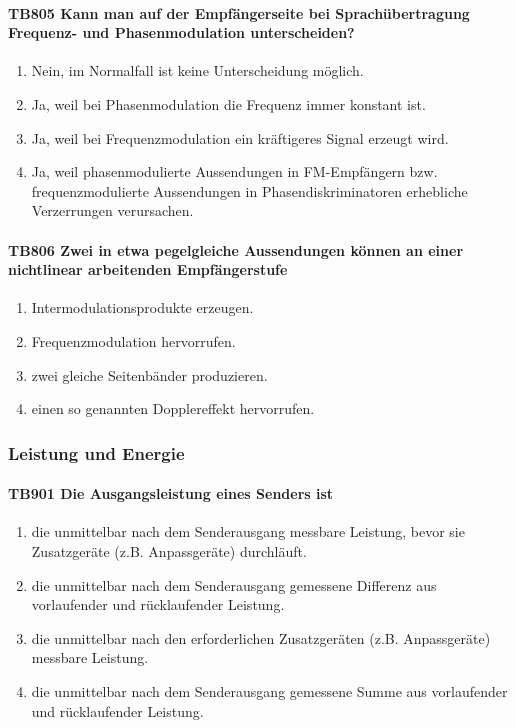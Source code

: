 \documentclass[8pt]{article}
\begin{document}
\begin{enumerate}
\paragraph*{TB805 Kann man auf der Empfängerseite bei Sprachübertragung Frequenz- und Phasenmodulation unterscheiden?}
\begin{enumerate}[nolistsep,label=\Alph*]
\item Nein, im Normalfall ist keine Unterscheidung möglich. 
\item Ja, weil bei Phasenmodulation die Frequenz immer konstant ist.
\item Ja, weil bei Frequenzmodulation ein kräftigeres Signal erzeugt wird.
\item Ja, weil phasenmodulierte Aussendungen in FM-Empfängern bzw. frequenzmodulierte Aussendungen in Phasendiskriminatoren erhebliche Verzerrungen verursachen.
\end{enumerate}

\paragraph*{TB806 Zwei in etwa pegelgleiche Aussendungen können an einer nichtlinear arbeitenden Empfängerstufe}
\begin{enumerate}[nolistsep,label=\Alph*]
\item Intermodulationsprodukte erzeugen.
\item Frequenzmodulation hervorrufen.
\item zwei gleiche Seitenbänder produzieren.
\item einen so genannten Dopplereffekt hervorrufen.
\end{enumerate}

\pagebreak
\subsubsection{Leistung und Energie}
\paragraph*{TB901 Die Ausgangsleistung eines Senders ist}
\begin{enumerate}[nolistsep,label=\Alph*]
\item die unmittelbar nach dem Senderausgang messbare Leistung, bevor sie Zusatzgeräte (z.B. Anpassgeräte) durchläuft.
\item die unmittelbar nach dem Senderausgang gemessene Differenz aus vorlaufender und rücklaufender Leistung.
\item die unmittelbar nach den erforderlichen Zusatzgeräten (z.B. Anpassgeräte) messbare Leistung.
\item die unmittelbar nach dem Senderausgang gemessene Summe aus vorlaufender und rücklaufender Leistung.
\end{enumerate}


\end{enumerate}
\end{document}
